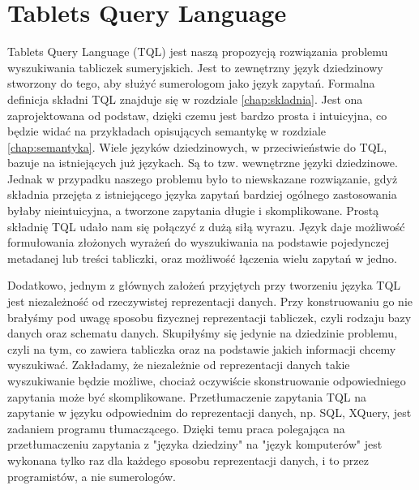 \chapter{Tablets Query Language}

Tablets Query Language (TQL) jest naszą propozycją rozwiązania problemu wyszukiwania tabliczek sumeryjskich.
Jest to zewnętrzny język dziedzinowy stworzony do tego, aby służyć sumerologom jako język zapytań.
Formalna definicja składni TQL znajduje się w rozdziale \ref{chap:skladnia}.
Jest ona zaprojektowana od podstaw, dzięki czemu jest bardzo prosta i intuicyjna, co będzie widać na przykładach opisujących semantykę w rozdziale \ref{chap:semantyka}. 
Wiele języków dziedzinowych, w przeciwieństwie do TQL, bazuje na istniejących już językach. Są to tzw. wewnętrzne języki dziedzinowe. Jednak w przypadku naszego problemu było to niewskazane rozwiązanie, gdyż składnia przejęta z istniejącego języka zapytań bardziej ogólnego zastosowania byłaby nieintuicyjna, a tworzone zapytania długie i skomplikowane.
Prostą składnię TQL udało nam się połączyć z dużą siłą wyrazu. Język daje możliwość formułowania złożonych 
wyrażeń do wyszukiwania na podstawie pojedynczej
metadanej lub treści tabliczki, oraz możliwość łączenia wielu zapytań w jedno.

Dodatkowo, jednym z głównych założeń przyjętych przy tworzeniu języka TQL jest niezależność od rzeczywistej
reprezentacji danych. Przy konstruowaniu go nie brałyśmy pod uwagę sposobu fizycznej reprezentacji tabliczek,
czyli rodzaju bazy danych oraz schematu danych. Skupiłyśmy się jedynie na dziedzinie problemu, czyli na tym,
co zawiera tabliczka oraz na podstawie jakich informacji chcemy wyszukiwać. Zakładamy, że niezależnie od
reprezentacji danych takie wyszukiwanie będzie możliwe, chociaż oczywiście skonstruowanie odpowiedniego
zapytania może być skomplikowane. Przetłumaczenie zapytania TQL na zapytanie w języku odpowiednim do
reprezentacji danych, np. SQL, XQuery, jest zadaniem programu tłumaczącego. Dzięki temu praca polegająca
na przetłumaczeniu zapytania z "języka dziedziny" na "język komputerów" jest wykonana tylko raz dla każdego
sposobu reprezentacji danych, i to przez programistów, a nie sumerologów.


